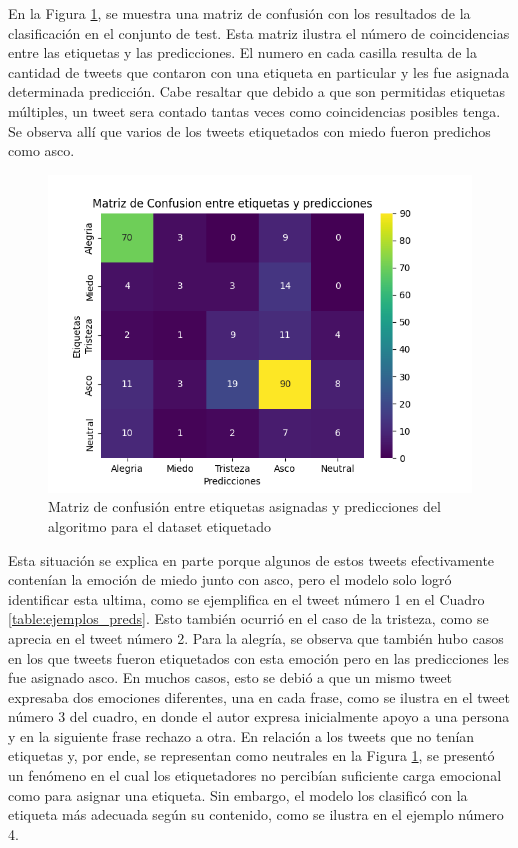En la Figura \ref{figure:Matriz}, se muestra una matriz de confusión con los resultados de la clasificación en el conjunto de test. Esta matriz ilustra el número de coincidencias entre las etiquetas y las predicciones. El numero en cada casilla resulta de la cantidad de tweets que contaron con una etiqueta en particular y les fue asignada determinada predicción. Cabe resaltar que debido a que son permitidas etiquetas múltiples, un tweet sera contado tantas veces como coincidencias posibles tenga. Se observa allí que varios de los tweets etiquetados con miedo fueron predichos como asco.




\begin{figure}[t]
	\centering
	\includegraphics[scale=0.75]{Images & Logos/Results/Matriz_confusion.png} 
	\caption{Matriz de confusión entre etiquetas asignadas y predicciones del algoritmo para el dataset etiquetado}
	\label{figure:Matriz}
\end{figure}


Esta situación se explica en parte porque algunos de estos tweets efectivamente contenían la emoción de miedo junto con asco, pero el modelo solo logró identificar esta ultima, como se ejemplifica en el tweet número 1 en el Cuadro \ref{table:ejemplos_preds}. Esto también ocurrió en el caso de la tristeza, como se aprecia en el tweet número 2. Para la alegría, se observa que también hubo casos en los que tweets fueron etiquetados con esta emoción pero en las predicciones les fue asignado  asco. En muchos casos, esto se debió a que un mismo tweet expresaba dos emociones diferentes, una en cada frase, como se ilustra en el tweet número 3 del cuadro, en donde el autor expresa inicialmente apoyo a una persona y en la siguiente frase rechazo a otra. En relación a los tweets que no tenían etiquetas y, por ende, se representan como neutrales en la Figura \ref{figure:Matriz}, se presentó un fenómeno en el cual los etiquetadores no percibían suficiente carga emocional como para asignar una etiqueta. Sin embargo, el modelo los clasificó con la etiqueta más adecuada según su contenido, como se ilustra en el ejemplo número 4.


